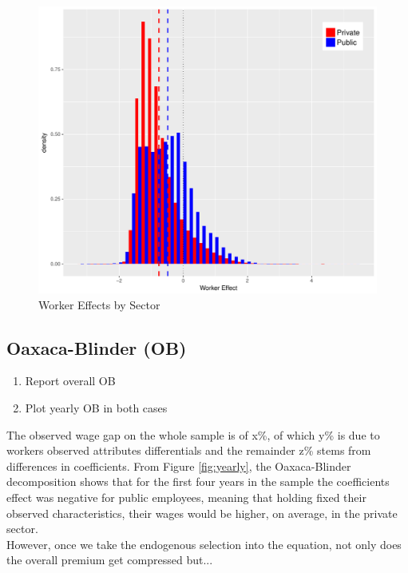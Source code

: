 \documentclass{article}
\begin{document}
\begin{figure}[h!]\label{fig:we}
  \caption{Worker Effects by Sector}
  \includegraphics[scale=0.7]{graphs/001_fe_sector_onepc.pdf}
\end{figure}
\subsection{Oaxaca-Blinder (OB)}
\begin{enumerate}
    \item Report overall OB 
    \item Plot yearly OB in both cases
\end{enumerate}
The observed wage gap on the whole sample is of x\%, of which y\% is due to workers observed attributes differentials and the remainder z\% stems from differences in coefficients. From Figure \ref{fig:yearly}, the Oaxaca-Blinder decomposition shows that for the first four years in the sample the coefficients effect was negative for public employees, meaning that holding fixed their observed characteristics, their wages would be higher, on average, in the private sector. \\

\noindent
However, once we take the endogenous selection into the equation, not only does the overall premium get compressed but...
\end{document}
